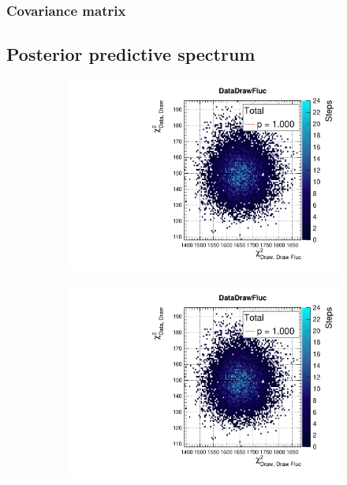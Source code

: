 \subsubsection{Covariance matrix}

\subsection{Posterior predictive spectrum}
\begin{figure}[h]
	\begin{subfigure}[t]{0.49\textwidth}
		\includegraphics[width=\textwidth, trim={0mm 0mm 0mm 11mm}, clip,page=1]{figures/mach3/Asimov/2017b_NewDet_3Xsec_4Det_5Flux_NewXSecTune_Asimov_merge_PostPred_procs}
	\end{subfigure}
	\begin{subfigure}[t]{0.49\textwidth}
		\includegraphics[width=\textwidth, trim={0mm 0mm 0mm 11mm}, clip,page=2]{figures/mach3/Asimov/2017b_NewDet_3Xsec_4Det_5Flux_NewXSecTune_Asimov_merge_PostPred_procs}
	\end{subfigure}
\end{figure}

